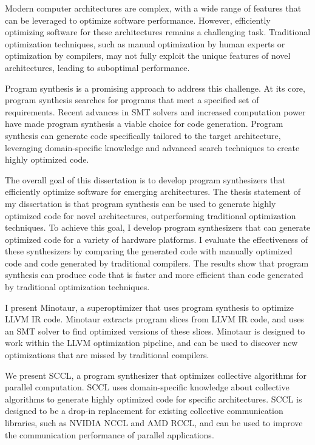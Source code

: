 Modern computer architectures are complex, with a wide range of
features that can be leveraged to optimize software performance.
However, efficiently optimizing software for these architectures
remains a challenging task. Traditional optimization techniques,
such as manual optimization by human experts or optimization by
compilers, may not fully exploit the unique features of novel
architectures, leading to suboptimal performance.

Program synthesis is a promising approach to address this challenge.
At its core, program synthesis searches for programs that meet a
specified set of requirements. Recent advances in SMT solvers and
increased computation power have made program synthesis a viable
choice for code generation. Program synthesis can generate code
specifically tailored to the target architecture, leveraging
domain-specific knowledge and advanced search techniques to create
highly optimized code.

The overall goal of this dissertation is to develop program
synthesizers that efficiently optimize software for emerging
architectures. The thesis statement of my dissertation is that program
synthesis can be used to generate highly optimized code for novel
architectures, outperforming traditional optimization techniques. To
achieve this goal, I develop program synthesizers that can
generate optimized code for a variety of hardware platforms. I
evaluate the effectiveness of these synthesizers by comparing the
generated code with manually optimized code and code generated by
traditional compilers. The results show that program synthesis can
produce code that is faster and more efficient than code generated by
traditional optimization techniques.

I present Minotaur, a superoptimizer that uses program synthesis
to optimize LLVM IR code. Minotaur extracts program slices from LLVM IR
code, and uses an SMT solver to find optimized versions of these slices.
Minotaur is designed to work within the LLVM optimization pipeline, and
can be used to discover new optimizations that are missed by traditional
compilers.

We present SCCL, a program synthesizer that optimizes collective
algorithms for parallel computation. SCCL uses domain-specific knowledge
about collective algorithms to generate highly optimized code for
specific architectures. SCCL is designed to be a drop-in replacement for
existing collective communication libraries, such as NVIDIA NCCL and AMD RCCL,
and can be used to improve the communication performance of parallel
applications.
